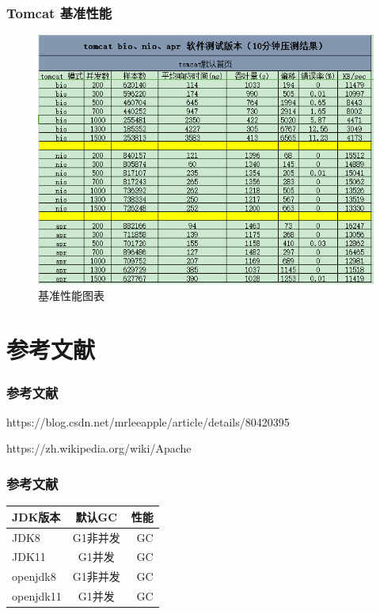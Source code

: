 \documentclass{beamer}
\begin{document}
\begin{frame}
\frametitle{Tomcat 基准性能}
\begin{figure}[ht]

\centering
\includegraphics[scale=0.45]{img/benchmark.png}
\caption{基准性能图表}
\label{fig:pathdemo1}
\end{figure}

\end{frame}


\section{参考文献}

\begin{frame}[allowframebreaks]
\frametitle{参考文献}
\small


https://blog.csdn.net/mrleeapple/article/details/80420395

https://zh.wikipedia.org/wiki/Apache%
\end{frame}

\begin{frame}[allowframebreaks]
\frametitle{参考文献}
\centering
\begin{tabular}{|l|c|r|}
\hline 
\large	JDK版本 &  \large 默认GC&  \large 性能 \\
\hline 
JDK8 & G1非并发 &  GC \\
\hline 
JDK11 & G1并发 & GC \\
\hline 
openjdk8 & G1非并发& GC  \\
\hline 
openjdk11& G1并发 & GC \\
\hline
\end{tabular}
\end{frame}
\end{document}

